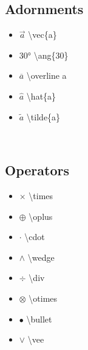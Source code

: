 \subsection*{Adornments}
\begin{minipage}{3cm}
\begin{itemize}[label={}]
    \item  $\vec{a}$ \textbackslash vec\{a\}
    \item $\ang{30}$ \textbackslash ang\{30\} 
    \item $\overline{a}$ \textbackslash overline a
\end{itemize} 
\end{minipage}
\begin{minipage}{3cm}
\begin{itemize}[label={}]
    \item $\hat{a}$ \textbackslash hat\{a\}
    \item $\tilde{a}$ \textbackslash tilde\{a\}
\end{itemize} 
\end{minipage}\ \\


\subsection*{Operators} 

\begin{minipage}{3cm}
\begin{itemize}[label={}]
    \item $\times$ \textbackslash times
    \item $\oplus$ \textbackslash oplus 
    \item $\cdot $ \textbackslash cdot 
    \item $\wedge$ \textbackslash wedge
\end{itemize} 
\end{minipage}
\begin{minipage}{3cm}
\begin{itemize}[label={}]
    \item $\div$ \textbackslash div
    \item $\otimes$ \textbackslash otimes
    \item $\bullet$ \textbackslash bullet
    \item $\vee$ \textbackslash vee
\end{itemize} 
\end{minipage}\ \\


